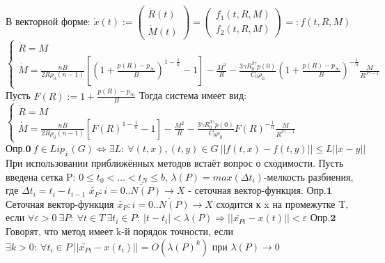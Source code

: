 \documentclass[a4paper,14pt]{article}
\begin{document}
В векторной форме: $\dot{x}(t):=\begin{pmatrix}\dot{R}(t) \\ \dot{M}(t) \end{pmatrix}=\begin{pmatrix}f_1(t,R,M) \\ f_2(t,R,M) \end{pmatrix}=:f(t,R,M)$\newline
$
\begin{cases}
\dot{R}=M\\
\dot{M}=\frac{nB}{2R\rho_0 (n-1)}\left[\left(1+\frac{p(R)-p_{\infty}}{B}\right)^{1-\frac{1}{n}}-1 \right]-\frac{M^2}{R}-\frac{3\gamma R_0^{3\gamma}p(0)}{C_0 \rho_0}\left(1+\frac{p(R)-p_{\infty}}{B}\right)^{-\frac{1}{n}}\frac{M}{R^{3\gamma-1}}
\end{cases}
$\newline
Пусть $F(R) := 1+\frac{p(R)-p_{\infty}}{B}$\newline
Тогда система имеет вид:\newline
$
\begin{cases}
\dot{R}=M\\
\dot{M}=\frac{nB}{2R\rho_0 (n-1)}\left[F(R)^{1-\frac{1}{n}}-1 \right]-\frac{M^2}{R}-\frac{3\gamma R_0^{3\gamma}p(0)}{C_0 \rho_0}F(R)^{-\frac{1}{n}}\frac{M}{R^{3\gamma-1}}
\end{cases}
$\newline
$\textbf{Опр.0}\ f \in Lip_x(G) \Leftrightarrow \exists L:\ \forall (t,x),(t,y)\in G \ ||f(t,x)-f(t,y)||\leq L||x-y||$\newline
При использовании приближённых методов встаёт вопрос о сходимости.\newline
Пусть введена сетка P: $0\leq t_0<\hdots<t_N\leq b$, $\lambda(P)=max(\Delta t_i)$-мелкость разбиения,\newline
где $\Delta t_i=t_i-t_{i-1}$\newline
$\tilde{x_P}:i=\overline{0..N(P)}\rightarrow X$ - сеточная вектор-функция.\newline
$\textbf{Опр.1}$ Сеточная вектор-функция $\tilde{x_P}:i=\overline{0..N(P)}\rightarrow X$ сходится к x на промежутке T, если\newline
$\forall \varepsilon >0\  \exists P:\ \forall t \in T\  \exists t_i \in P:\  |t-t_i|<\lambda(P) \Rightarrow ||\tilde{x_{Pi}}-x(t)||<\varepsilon$\newline
$\textbf{Опр.2}$ Говорят, что метод имеет k-й порядок точности, если\newline
$\exists k>0:\  \forall t_i \in P\  ||\tilde{x_{Pi}}-x(t_i)||=O(\lambda(P)^k)$ при $\lambda(P)\rightarrow 0$
\end{document}
